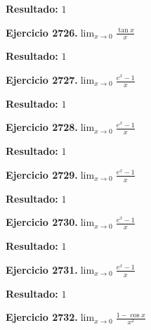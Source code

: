 \documentclass[10pt,a4paper]{article}
\begin{document}
\begin{solbox}
\textbf{Resultado:} \(\displaystyle 1\)
\end{solbox}

\begin{ejbox}
\textbf{Ejercicio 2726.}\quad $\lim_{x\to 0} \frac{\tan x}{x}$
\end{ejbox}

\begin{solbox}
\textbf{Resultado:} \(\displaystyle 1\)
\end{solbox}

\newpage
\begin{ejbox}
\textbf{Ejercicio 2727.}\quad $\lim_{x\to 0} \frac{e^x-1}{x}$
\end{ejbox}

\begin{solbox}
\textbf{Resultado:} \(\displaystyle 1\)
\end{solbox}

\begin{ejbox}
\textbf{Ejercicio 2728.}\quad $\lim_{x\to 0} \frac{e^x-1}{x}$
\end{ejbox}

\begin{solbox}
\textbf{Resultado:} \(\displaystyle 1\)
\end{solbox}

\begin{ejbox}
\textbf{Ejercicio 2729.}\quad $\lim_{x\to 0} \frac{e^x-1}{x}$
\end{ejbox}

\begin{solbox}
\textbf{Resultado:} \(\displaystyle 1\)
\end{solbox}

\newpage
\begin{ejbox}
\textbf{Ejercicio 2730.}\quad $\lim_{x\to 0} \frac{e^x-1}{x}$
\end{ejbox}

\begin{solbox}
\textbf{Resultado:} \(\displaystyle 1\)
\end{solbox}

\begin{ejbox}
\textbf{Ejercicio 2731.}\quad $\lim_{x\to 0} \frac{e^x-1}{x}$
\end{ejbox}

\begin{solbox}
\textbf{Resultado:} \(\displaystyle 1\)
\end{solbox}

\begin{ejbox}
\textbf{Ejercicio 2732.}\quad $\lim_{x\to 0} \frac{1-\cos x}{x^2}$
\end{ejbox}
\end{document}

